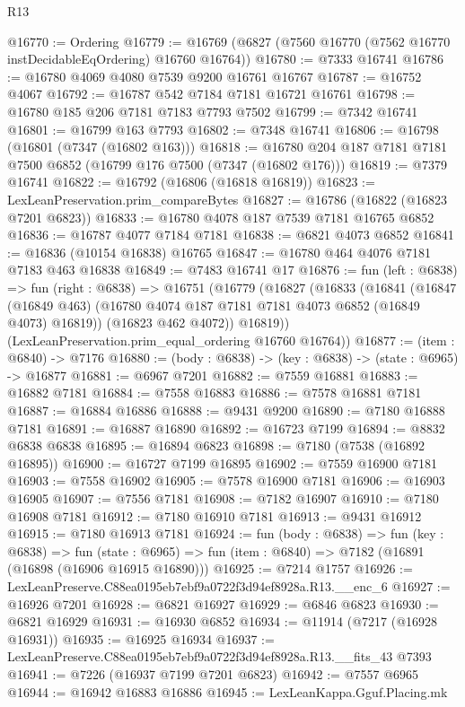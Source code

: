 \begin{lexlean}{R13}
\begin{coremodule}
@16770 := Ordering
@16779 := @16769 (@6827 (@7560 @16770 (@7562 @16770 instDecidableEqOrdering) @16760 @16764))
@16780 := @7333 @16741
@16786 := @16780 @4069 @4080 @7539 @9200 @16761 @16767
@16787 := @16752 @4067
@16792 := @16787 @542 @7184 @7181 @16721 @16761
@16798 := @16780 @185 @206 @7181 @7183 @7793 @7502
@16799 := @7342 @16741
@16801 := @16799 @163 @7793
@16802 := @7348 @16741
@16806 := @16798 (@16801 (@7347 (@16802 @163)))
@16818 := @16780 @204 @187 @7181 @7181 @7500 @6852 (@16799 @176 @7500 (@7347 (@16802 @176)))
@16819 := @7379 @16741
@16822 := @16792 (@16806 (@16818 @16819))
@16823 := LexLeanPreservation.prim_compareBytes
@16827 := @16786 (@16822 (@16823 @7201 @6823))
@16833 := @16780 @4078 @187 @7539 @7181 @16765 @6852
@16836 := @16787 @4077 @7184 @7181
@16838 := @6821 @4073 @6852
@16841 := @16836 (@10154 @16838) @16765
@16847 := @16780 @464 @4076 @7181 @7183 @463 @16838
@16849 := @7483 @16741 @17
@16876 := fun (left : @6838) =>
  fun (right : @6838) =>
  @16751
    (@16779
      (@16827
        (@16833
          (@16841
            (@16847 (@16849 @463) (@16780 @4074 @187 @7181 @7181 @4073 @6852 (@16849 @4073) @16819))
            (@16823 @462 @4072))
          @16819))
      (LexLeanPreservation.prim_equal_ordering @16760 @16764))
@16877 := (item : @6840) -> @7176
@16880 := (body : @6838) -> (key : @6838) -> (state : @6965) -> @16877
@16881 := @6967 @7201
@16882 := @7559 @16881
@16883 := @16882 @7181
@16884 := @7558 @16883
@16886 := @7578 @16881 @7181
@16887 := @16884 @16886
@16888 := @9431 @9200
@16890 := @7180 @16888 @7181
@16891 := @16887 @16890
@16892 := @16723 @7199
@16894 := @8832 @6838 @6838
@16895 := @16894 @6823
@16898 := @7180 (@7538 (@16892 @16895))
@16900 := @16727 @7199 @16895
@16902 := @7559 @16900 @7181
@16903 := @7558 @16902
@16905 := @7578 @16900 @7181
@16906 := @16903 @16905
@16907 := @7556 @7181
@16908 := @7182 @16907
@16910 := @7180 @16908 @7181
@16912 := @7180 @16910 @7181
@16913 := @9431 @16912
@16915 := @7180 @16913 @7181
@16924 := fun (body : @6838) =>
  fun (key : @6838) =>
  fun (state : @6965) => fun (item : @6840) => @7182 (@16891 (@16898 (@16906 @16915 @16890)))
@16925 := @7214 @1757
@16926 := LexLeanPreserve.C88ea0195eb7ebf9a0722f3d94ef8928a.R13.__enc_6
@16927 := @16926 @7201
@16928 := @6821 @16927
@16929 := @6846 @6823
@16930 := @6821 @16929
@16931 := @16930 @6852
@16934 := @11914 (@7217 (@16928 @16931))
@16935 := @16925 @16934
@16937 := LexLeanPreserve.C88ea0195eb7ebf9a0722f3d94ef8928a.R13.__fits_43 @7393
@16941 := @7226 (@16937 @7199 @7201 @6823)
@16942 := @7557 @6965
@16944 := @16942 @16883 @16886
@16945 := LexLeanKappa.Gguf.Placing.mk

\end{coremodule}
\end{lexlean}
